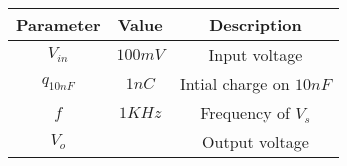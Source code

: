 \begin{tabular}{|c|c|c|}
        \hline
        \textbf{Parameter} & \textbf{Value} & \textbf{Description} \\
        \hline
        $V_{in}$ & $100mV$ & Input voltage \\
        \hline
        $q_{10nF}$ & $1nC$ & Intial charge on $10nF$ \\
        \hline
        $f$ & $1KHz$ & Frequency of $V_s$ \\
        \hline
        $V_o$ &  & Output voltage \\
        \hline
    \end{tabular}
